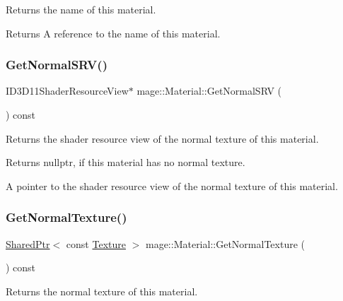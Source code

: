Returns the name of this material.

\begin{DoxyReturn}{Returns}
A reference to the name of this material. 
\end{DoxyReturn}
\hypertarget{structmage_1_1_material_a0be98911c56dedaa4fd2f8714fc8a793}{}\label{structmage_1_1_material_a0be98911c56dedaa4fd2f8714fc8a793} 
\subsubsection{\texorpdfstring{Get\+Normal\+S\+R\+V()}{GetNormalSRV()}}
{\footnotesize\ttfamily I\+D3\+D11\+Shader\+Resource\+View$\ast$ mage\+::\+Material\+::\+Get\+Normal\+S\+RV (\begin{DoxyParamCaption}{ }\end{DoxyParamCaption}) const\hspace{0.3cm}{\ttfamily [noexcept]}}

Returns the shader resource view of the normal texture of this material.

\begin{DoxyReturn}{Returns}
{\ttfamily nullptr}, if this material has no normal texture. 

A pointer to the shader resource view of the normal texture of this material. 
\end{DoxyReturn}
\hypertarget{structmage_1_1_material_a41a286cf05a2627ee0baef602b01a1fb}{}\label{structmage_1_1_material_a41a286cf05a2627ee0baef602b01a1fb} 
\subsubsection{\texorpdfstring{Get\+Normal\+Texture()}{GetNormalTexture()}}
{\footnotesize\ttfamily \hyperlink{namespacemage_a1e01ae66713838a7a67d30e44c67703e}{Shared\+Ptr}$<$ const \hyperlink{classmage_1_1_texture}{Texture} $>$ mage\+::\+Material\+::\+Get\+Normal\+Texture (\begin{DoxyParamCaption}{ }\end{DoxyParamCaption}) const\hspace{0.3cm}{\ttfamily [noexcept]}}

Returns the normal texture of this material.

